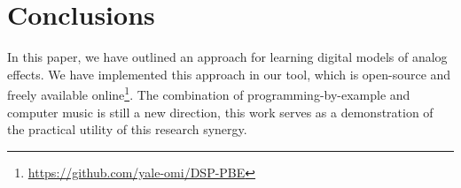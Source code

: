 \section{Conclusions}

In this paper, we have outlined an approach for learning digital models of analog effects.
We have implemented this approach in our tool, which is open-source and freely available online\footnote{\url{https://github.com/yale-omi/DSP-PBE}}.
The combination of programming-by-example and computer music is still a new direction, this work serves as a demonstration of the practical utility of this research synergy.
